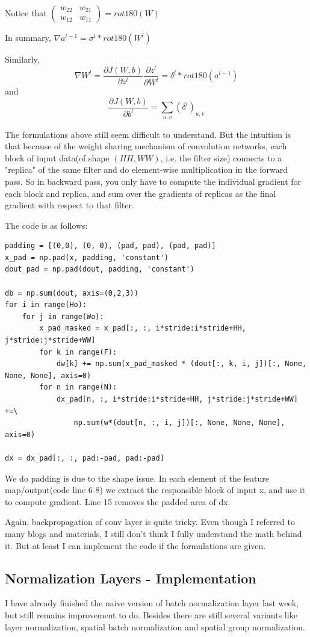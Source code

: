 \documentclass{article} %
\begin{document}
Notice that $\left( \begin{array}{ccc} 
w_{22}&w_{21}\\ 
w_{12}&w_{11} 
\end{array} \right)  = rot180(W)$

In summary, $\nabla a^{l-1}=\sigma^l * rot180(W^l)$

Similarly, 
$$\nabla W^{l} = \frac{\partial J(W,b)}{\partial z^{l}}\frac{\partial z^{l}}{\partial W^{l}} =\delta^l*rot180(a^{l-1})$$
and
$$\frac{\partial J(W,b)}{\partial b^{l}} = \sum\limits_{u,v}(\delta^l)_{u,v}$$

The formulations above still seem difficult to understand. But the intuition is that because of the weight sharing mechanism of convolution networks, each block of input data(of shape $(HH,WW)$, i.e. the filter size) connects to a "replica" of the same filter and do element-wise multiplication in the forward pass. So in backward pass, you only have to compute the individual gradient for each block and replica, and sum over the gradients of replicas as the final gradient with respect to that filter.

The code is as follows:
\begin{lstlisting}
padding = [(0,0), (0, 0), (pad, pad), (pad, pad)]
x_pad = np.pad(x, padding, 'constant')
dout_pad = np.pad(dout, padding, 'constant')

db = np.sum(dout, axis=(0,2,3))
for i in range(Ho):
	for j in range(Wo):
		x_pad_masked = x_pad[:, :, i*stride:i*stride+HH, j*stride:j*stride+WW]
		for k in range(F):
			dw[k] += np.sum(x_pad_masked * (dout[:, k, i, j])[:, None, None, None], axis=0)
		for n in range(N):
			dx_pad[n, :, i*stride:i*stride+HH, j*stride:j*stride+WW] +=\
				np.sum(w*(dout[n, :, i, j])[:, None, None, None], axis=0)

dx = dx_pad[:, :, pad:-pad, pad:-pad]
\end{lstlisting}
We do padding is due to the shape issue. In each element of the feature map/output(code line 6-8) we extract the responsible block of input x, and use it to compute gradient. Line 15 removes the padded area of dx.

Again, backpropagation of conv layer is quite tricky. Even though I referred to many blogs and materials, I still don't think I fully understand the math behind it. But at least I can implement the code if the formulations are given. 

\subsection{Normalization Layers - Implementation}
I have already finished the naive version of batch normalization layer last week, but still remains improvement to do. Besides there are still several variants like layer normalization, spatial batch normalization and spatial group normalization.
\end{document}
